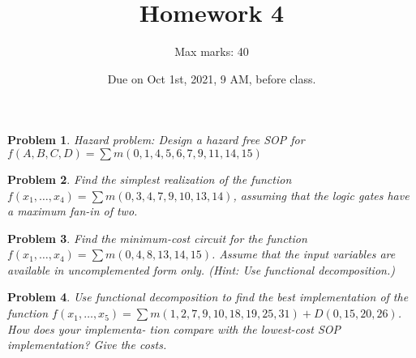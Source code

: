 \documentclass[onecolumn]{article}
\title{Homework 4}
\author{Max marks: 40}
\date{Due on Oct 1st, 2021, 9 AM, before class.}
\newtheorem{prob}{Problem}
\begin{document}
\maketitle
\begin{prob}
  Hazard problem: Design a hazard free SOP for $f(A,B,C,D) = \sum m(0,1,4,5,6,7,9,11,14,15)$
\end{prob}

\begin{prob}
  Find the simplest realization of the function $f (x_1 , \dots, x_4 ) = \sum m(0, 3, 4, 7, 9, 10, 13, 14)$,
  assuming that the logic gates have a maximum fan-in of two.
\end{prob}
\begin{prob}
  Find the minimum-cost circuit for the function $f (x_1 , \dots, x_4 ) = \sum m(0, 4, 8, 13, 14, 15)$.
  Assume that the input variables are available in uncomplemented form only. (Hint: Use
  functional decomposition.)
\end{prob}
\begin{prob}
  Use functional
  decomposition to find the best implementation of the function $f (x_1 , \dots,
  x_5 ) = \sum m(1, 2, 7, 9, 10, 18, 19, 25, 31) + D(0, 15, 20, 26)$. How does your implementa-
  tion compare with the lowest-cost SOP implementation? Give the costs.
\end{prob}


%
%
\end{document}
